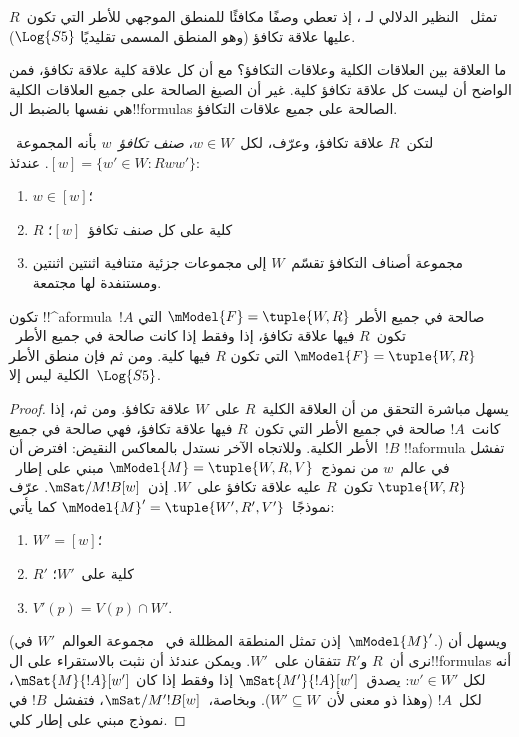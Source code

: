 \documentclass[../../../include/open-logic-section]{subfiles}
\begin{document}
تمثل~ النظير الدلالي لـ
، إذ تعطي وصفًا مكافئًا للمنطق الموجهي
للأطر التي تكون~$R$ عليها علاقة تكافؤ (وهو المنطق المسمى تقليديًا
$\Log{S5}$).

ما العلاقة بين العلاقات الكلية وعلاقات التكافؤ؟ مع أن كل علاقة كلية
علاقة تكافؤ، فمن الواضح أن ليست كل علاقة تكافؤ كلية. غير أن
الصيغ الصالحة على جميع العلاقات الكلية هي نفسها بالضبط
ال!!{formula}s الصالحة على جميع علاقات التكافؤ.

\begin{prop}
  لتكن~$R$ علاقة تكافؤ، وعرّف، لكل~$w \in W$، \emph{صنف تكافؤ}~$w$
  بأنه المجموعة~$[w] = \{w'\in W : Rww'\}$. عندئذ:
  \begin{enumerate}
  \item $w \in [w]$؛
  \item $R$ كلية على كل صنف تكافؤ~$[w]$؛
  \item مجموعة أصناف التكافؤ تقسّم~$W$ إلى مجموعات جزئية متنافية
    اثنتين اثنتين ومستنفدة لها مجتمعة.
  \end{enumerate}
\end{prop}

\begin{prop}
  تكون !!^a{formula}~$!A$ صالحة في جميع الأطر
  $\mModel{F} =\tuple{W,R}$ التي تكون~$R$ فيها علاقة تكافؤ، إذا وفقط
  إذا كانت صالحة في جميع الأطر~$\mModel{F} =\tuple{W,R}$ التي تكون
  $R$ فيها كلية. ومن ثم فإن منطق الأطر الكلية ليس إلا~$\Log{S5}$.
\end{prop}

\begin{proof}
  يسهل مباشرة التحقق من أن العلاقة الكلية~$R$ على~$W$ علاقة تكافؤ.
  ومن ثم، إذا كانت~$!A$ صالحة في جميع الأطر التي تكون~$R$ فيها علاقة
  تكافؤ، فهي صالحة في جميع الأطر الكلية. وللاتجاه الآخر نستدل
  بالمعاكس النقيض: افترض أن~$!B$ !!a{formula} تفشل في عالم~$w$ من
  نموذج~$\mModel{M} = \tuple{W, R, V}$ مبني على إطار~$\tuple{W,R}$
  تكون~$R$ عليه علاقة تكافؤ على~$W$. إذن~$\mSat/{M}{!B}[w]$. عرّف
  نموذجًا~$\mModel{M}' = \tuple{W', R', V'}$ كما يأتي:
  \begin{enumerate}
  \item $W' = [w]$؛
  \item $R'$ كلية على~$W'$؛
  \item $V'(p) = V(p) \cap W'$.
  \end{enumerate}
  (إذن تمثل المنطقة المظللة في~ مجموعة
  العوالم~$W'$ في~$\mModel{M}'$.) ويسهل أن نرى أن~$R$ و$R'$ تتفقان
  على~$W'$. ويمكن عندئذ أن نثبت بالاستقراء على ال!!{formula}s أنه لكل
  $w' \in W'$: يصدق~$\mSat{M'}{!A}[w']$ إذا وفقط إذا كان
  $\mSat{M}{!A}[w']$، لكل~$!A$ (وهذا ذو معنى لأن~$W' \subseteq W$).
  وبخاصة،~$\mSat/{M'}{!B}[w]$، فتفشل~$!B$ في نموذج مبني على إطار كلي.
\end{proof}
\end{document}
